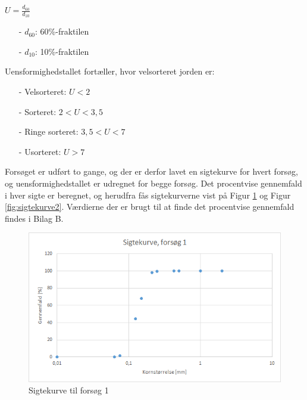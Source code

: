 \begin{center}
	$U = \frac{d_{60}}{d_{10}}$
\end{center}

\begin{itemize}
	\item[-] $d_{60}$: 60\%-fraktilen
	\item[-] $d_{10}$: 10\%-fraktilen
\end{itemize}

Uensformighedstallet fortæller, hvor velsorteret jorden er:

\begin{itemize}
	\item[-] Velsorteret: $U < 2$
	\item[-] Sorteret: $2 < U < 3,\!5$
	\item[-] Ringe sorteret: $3,\!5 < U < 7$
	\item[-] Usorteret: $U > 7$
\end{itemize}

Forsøget er udført to gange, og der er derfor lavet en sigtekurve for hvert forsøg, og uensformighedstallet er udregnet for begge forsøg. 
\newline \indent{     }  Det procentvise gennemfald i hver sigte er beregnet, og herudfra fås sigtekurverne vist på Figur \ref{fig:sigtekurve1} og Figur \ref{fig:sigtekurve2}. Værdierne der er brugt til at finde det procentvise gennemfald findes i Bilag B. 

\begin{figure}[htbp]
		\includegraphics[width=1.0\textwidth]{billeder/sigtekurve1.png}
		\caption{Sigtekurve til forsøg 1}
		\label{fig:sigtekurve1}
\end{figure}


